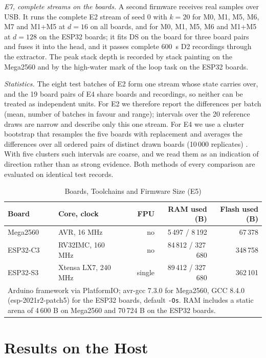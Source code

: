 \documentclass[journal,twoside,web]{ieeecolor}
\begin{document}
\emph{E7, complete streams on the boards.} A second firmware receives real samples over USB. It runs the complete E2 stream of seed 0 with $k=20$ for M0, M1, M5, M6, M7 and M1+M5 at $d=16$ on all boards, and for M0, M1, M5, M6 and M1+M5 at $d=128$ on the ESP32 boards; it fits DS on the board for three board pairs and fuses it into the head, and it passes complete 600~s D2 recordings through the extractor. The peak stack depth is recorded by stack painting on the Mega2560 and by the high-water mark of the loop task on the ESP32 boards.

\emph{Statistics.} The eight test batches of E2 form one stream whose state carries over, and the 19 board pairs of E4 share boards and recordings, so neither can be treated as independent units. For E2 we therefore report the differences per batch (mean, number of batches in favour and range); intervals over the 20 reference draws are narrow and describe only this one stream. For E4 we use a cluster bootstrap that resamples the five boards with replacement and averages the differences over all ordered pairs of distinct drawn boards (10\,000 replicates) \cite{davison}. With five clusters such intervals are coarse, and we read them as an indication of direction rather than as strong evidence. Both methods of every comparison are evaluated on identical test records.

\begin{table}[t]
\caption{Boards, Toolchains and Firmware Size (E5)}
\label{tab:boards}\centering\scriptsize\setlength{\tabcolsep}{2.5pt}
\begin{tabular}{l l r r r}\toprule
Board & Core, clock & FPU & RAM used (B) & Flash used (B)\\\midrule
Mega2560 & AVR, 16 MHz & no & 5\,497 / 8\,192 & 67\,378\\
ESP32-C3 & RV32IMC, 160 MHz & no & 84\,812 / 327\,680 & 348\,758\\
ESP32-S3 & Xtensa LX7, 240 MHz & single & 89\,412 / 327\,680 & 362\,101\\\bottomrule
\multicolumn{5}{p{0.9\columnwidth}}{\scriptsize Arduino framework via PlatformIO; avr-gcc 7.3.0 for Mega2560, GCC 8.4.0 (esp-2021r2-patch5) for the ESP32 boards, default \texttt{-Os}. RAM includes a static arena of 4\,600 B on Mega2560 and 70\,724 B on the ESP32 boards.}
\end{tabular}
\end{table}

\section{Results on the Host}
\end{document}
